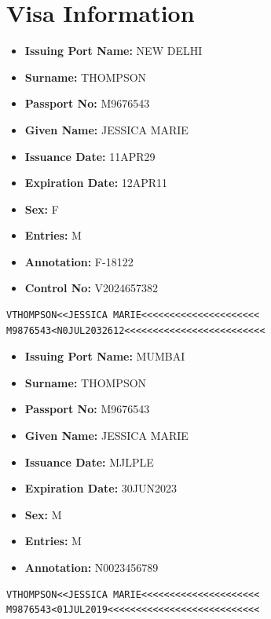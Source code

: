 \documentclass{article}
\begin{document}
\section*{Visa Information}

\begin{itemize}
    \item \textbf{Issuing Port Name:} NEW DELHI
    \item \textbf{Surname:} THOMPSON
    \item \textbf{Passport No:} M9676543
    \item \textbf{Given Name:} JESSICA MARIE
    \item \textbf{Issuance Date:} 11APR29
    \item \textbf{Expiration Date:} 12APR11
    \item \textbf{Sex:} F
    \item \textbf{Entries:} M
    \item \textbf{Annotation:} F-18122
    \item \textbf{Control No:} V2024657382
\end{itemize}

\begin{verbatim}
VTHOMPSON<<JESSICA MARIE<<<<<<<<<<<<<<<<<<<<<
M9876543<N0JUL2032612<<<<<<<<<<<<<<<<<<<<<<<<<
\end{verbatim}

\bigskip

\begin{itemize}
    \item \textbf{Issuing Port Name:} MUMBAI
    \item \textbf{Surname:} THOMPSON
    \item \textbf{Passport No:} M9676543
    \item \textbf{Given Name:} JESSICA MARIE
    \item \textbf{Issuance Date:} MJLPLE
    \item \textbf{Expiration Date:} 30JUN2023
    \item \textbf{Sex:} M
    \item \textbf{Entries:} M
    \item \textbf{Annotation:} N0023456789
\end{itemize}

\begin{verbatim}
VTHOMPSON<<JESSICA MARIE<<<<<<<<<<<<<<<<<<<<<
M9876543<01JUL2019<<<<<<<<<<<<<<<<<<<<<<<<<<<
\end{verbatim}
\end{document}
